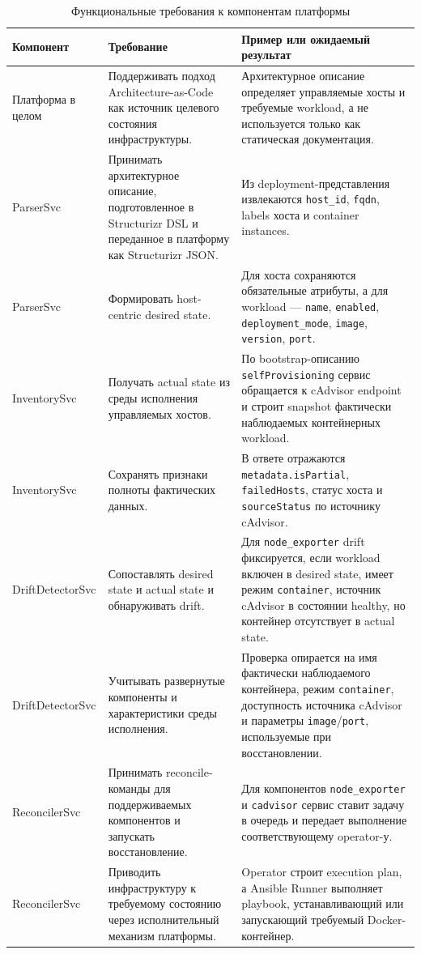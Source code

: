 \begingroup
    \footnotesize
    \begin{longtable}{|p{}|p{}|p{}|}
    \caption{Функциональные требования к компонентам платформы}
    \label{tab:ch2-functional-requirements}\\ \hline
    Компонент & Требование & Пример или ожидаемый результат \\ \hline
    Платформа в целом & Поддерживать подход Architecture-as-Code как источник целевого состояния инфраструктуры. & Архитектурное описание определяет управляемые хосты и требуемые workload, а не используется только как статическая документация. \\ \hline
    ParserSvc & Принимать архитектурное описание, подготовленное в Structurizr DSL и переданное в платформу как Structurizr JSON. & Из deployment-представления извлекаются \texttt{host\_id}, \texttt{fqdn}, labels хоста и container instances. \\ \hline
    ParserSvc & Формировать host-centric desired state. & Для хоста сохраняются обязательные атрибуты, а для workload --- \texttt{name}, \texttt{enabled}, \texttt{deployment\_mode}, \texttt{image}, \texttt{version}, \texttt{port}. \\ \hline
    InventorySvc & Получать actual state из среды исполнения управляемых хостов. & По bootstrap-описанию \texttt{selfProvisioning} сервис обращается к cAdvisor endpoint и строит snapshot фактически наблюдаемых контейнерных workload. \\ \hline
    InventorySvc & Сохранять признаки полноты фактических данных. & В ответе отражаются \texttt{metadata.isPartial}, \texttt{failedHosts}, статус хоста и \texttt{sourceStatus} по источнику cAdvisor. \\ \hline
    DriftDetectorSvc & Сопоставлять desired state и actual state и обнаруживать drift. & Для \texttt{node\_exporter} drift фиксируется, если workload включен в desired state, имеет режим \texttt{container}, источник cAdvisor в состоянии healthy, но контейнер отсутствует в actual state. \\ \hline
    DriftDetectorSvc & Учитывать развернутые компоненты и характеристики среды исполнения. & Проверка опирается на имя фактически наблюдаемого контейнера, режим \texttt{container}, доступность источника cAdvisor и параметры \texttt{image}/\texttt{port}, используемые при восстановлении. \\ \hline
    ReconcilerSvc & Принимать reconcile-команды для поддерживаемых компонентов и запускать восстановление. & Для компонентов \texttt{node\_exporter} и \texttt{cadvisor} сервис ставит задачу в очередь и передает выполнение соответствующему operator-у. \\ \hline
    ReconcilerSvc & Приводить инфраструктуру к требуемому состоянию через исполнительный механизм платформы. & Operator строит execution plan, а Ansible Runner выполняет playbook, устанавливающий или запускающий требуемый Docker-контейнер. \\ \hline
    \end{longtable}
    \normalsize
\endgroup


